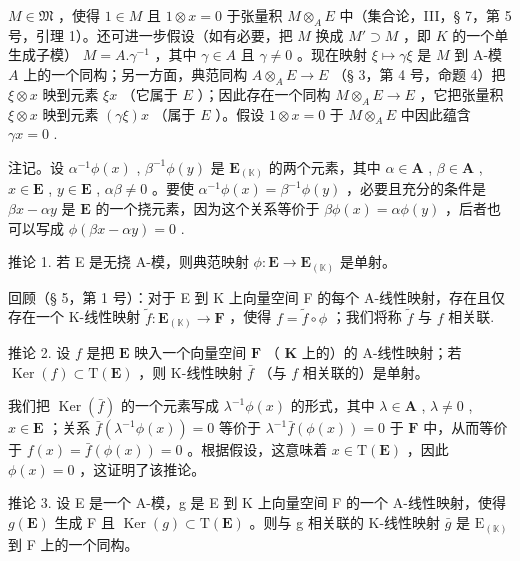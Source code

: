 \(M \in \mathfrak{M}\) ，使得 \(1 \in M\) 且 \(1 \otimes x = 0\) 于张量积 \(M \otimes_{A} E\) 中（集合论，III，§ 7，第 5 号，引理 1）。还可进一步假设（如有必要，把 \(M\) 换成 \(M' \supset M\) ，即 \(K\) 的一个单生成子模） \(M = A. \gamma^{-1}\) ，其中 \(\gamma \in A\) 且 \(\gamma \neq 0\) 。现在映射 \(\xi \mapsto \gamma\xi\) 是 \(M\) 到 A-模 \(A\) 上的一个同构；另一方面，典范同构 \(A \otimes_{A} E \to E\) （§ 3，第 4 号，命题 4）把 \(\xi \otimes x\) 映到元素 \(\xi x\) （它属于 \(E\) ）；因此存在一个同构 \(M \otimes_{A} E \to E\) ，它把张量积 \(\xi \otimes x\) 映到元素 \((\gamma\xi)x\) （属于 \(E\) ）。假设 \(1 \otimes x = 0\) 于 \(M \otimes_{A} E\) 中因此蕴含 \(\gamma x = 0\) .

注记。设 \(\alpha^{-1}\phi(x)\) , \(\beta^{-1}\phi(y)\) 是 \(\mathbf{E}_{(\mathbb{K})}\) 的两个元素，其中 \(\alpha\in\mathbf{A}\) , \(\beta\in\mathbf{A}\) , \(x\in\mathbf{E}\) , \(y\in\mathbf{E}\) , \(\alpha\beta\neq0\) 。要使 \(\alpha^{-1}\phi(x)=\beta^{-1}\phi(y)\) ，必要且充分的条件是 \(\beta x-\alpha y\) 是 \(\mathbf{E}\) 的一个挠元素，因为这个关系等价于 \(\beta\phi(x)=\alpha\phi(y)\) ，后者也可以写成 \(\phi(\beta x-\alpha y)=0\) .

推论 1. 若 E 是无挠 A-模，则典范映射 \(\phi: \mathbf{E} \to \mathbf{E}_{(\mathbb{K})}\) 是单射。

回顾（§ 5，第 1 号）：对于 E 到 K 上向量空间 F 的每个 A-线性映射，存在且仅存在一个 K-线性映射 \(\tilde{f}\colon\mathbf{E}_{(\mathbb{K})}\to\mathbf{F}\) ，使得 \(f=\tilde{f}\circ\phi\) ；我们将称 \(\tilde{f}\) 与 \(f\) 相关联.

推论 2. 设 \(f\) 是把 \(\mathbf{E}\) 映入一个向量空间 \(\mathbf{F}\) （ \(\mathbf{K}\) 上的）的 A-线性映射；若 \(\operatorname{Ker}(f) \subset \mathrm{T}(\mathbf{E})\) ，则 K-线性映射 \(\bar{f}\) （与 \(f\) 相关联的）是单射。

我们把 \(\operatorname{Ker}(\bar{f})\) 的一个元素写成 \(\lambda^{-1}\phi(x)\) 的形式，其中 \(\lambda \in \mathbf{A}\) , \(\lambda \neq 0\) , \(x \in \mathbf{E}\) ；关系 \(\bar{f}(\lambda^{-1}\phi(x)) = 0\) 等价于 \(\lambda^{-1}\bar{f}(\phi(x)) = 0\) 于 \(\mathbf{F}\) 中，从而等价于 \(f(x) = \bar{f}(\phi(x)) = 0\) 。根据假设，这意味着 \(x \in \mathrm{T}(\mathbf{E})\) ，因此 \(\phi(x) = 0\) ，这证明了该推论。

推论 3. 设 E 是一个 A-模，g 是 E 到 K 上向量空间 F 的一个 A-线性映射，使得 \(g(\mathbf{E})\) 生成 F 且 \(\operatorname{Ker}(g) \subset \mathrm{T}(\mathbf{E})\) 。则与 g 相关联的 K-线性映射 \(\bar{g}\) 是 \(\mathrm{E}_{(\mathbb{K})}\) 到 F 上的一个同构。

